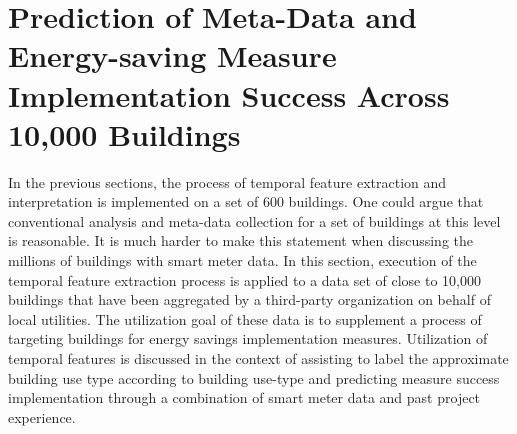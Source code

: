\section{Prediction of Meta-Data and Energy-saving Measure Implementation Success Across 10,000 Buildings}
\label{sec:scalability}

In the previous sections, the process of temporal feature extraction and interpretation is implemented on a set of 600 buildings. One could argue that conventional analysis and meta-data collection for a set of buildings at this level is reasonable. It is much harder to make this statement when discussing the millions of buildings with smart meter data. In this section, execution of the temporal feature extraction process is applied to a data set of close to 10,000 buildings that have been aggregated by a third-party organization on behalf of local utilities. The utilization goal of these data is to supplement a process of targeting buildings for energy savings implementation measures. Utilization of temporal features is discussed in the context of assisting to label the approximate building use type according to building use-type and predicting measure success implementation through a combination of smart meter data and past project experience.


